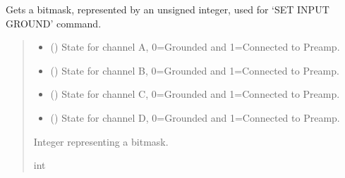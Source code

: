 \documentclass[letterpaper,10pt,english]{sphinxmanual}
\begin{document}
\begin{fulllineitems}
\begin{fulllineitems}
\label{\detokenize{Morelia.Devices:Morelia.Devices.PodDevice_8401HR.Pod8401HR.GetChannelBitmask}}
\pysigstartsignatures
{}
\pysigstopsignatures
\sphinxAtStartPar
Gets a bitmask, represented by an unsigned integer, used for ‘SET INPUT GROUND’ command.
\begin{quote}\begin{description}
\begin{itemize}
\item {} 
\sphinxAtStartPar
{} () \textendash{} State for channel A, 0=Grounded and 1=Connected to Preamp.

\item {} 
\sphinxAtStartPar
{} () \textendash{} State for channel B, 0=Grounded and 1=Connected to Preamp.

\item {} 
\sphinxAtStartPar
{} () \textendash{} State for channel C, 0=Grounded and 1=Connected to Preamp.

\item {} 
\sphinxAtStartPar
{} () \textendash{} State for channel D, 0=Grounded and 1=Connected to Preamp.

\end{itemize}

\sphinxAtStartPar
Integer representing a bitmask.

\sphinxAtStartPar
int

\end{description}\end{quote}

\end{fulllineitems}


\end{fulllineitems}
\end{document}
